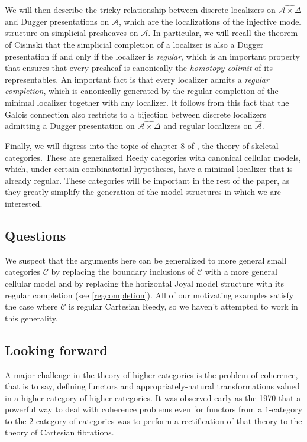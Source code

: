 \documentclass[a4paper]{article}
\numberwithin{equation}{subsection}
\theoremstyle{plain}   %
\theoremstyle{definition}
\theoremstyle{remark}
\theoremstyle{plain}
\newcommand{\psh}[1]{\ensuremath{\widehat{#1}}}
\providecommand{\C}{}
\renewcommand{\C}{\ensuremath{\mathcal{C}}}
\begin{document}
We will then describe the tricky relationship between discrete localizers on \(\psh{\mathcal{A}\times \Delta}\) and Dugger presentations on \(\mathcal{A}\), which are the localizations of the injective model structure on simplicial presheaves on \(\mathcal{A}\).  In particular, we will recall the theorem of Cisinski that the simplicial completion of a localizer is also a Dugger presentation if and only if the localizer is \emph{regular}, which is an important property that ensures that every presheaf is canonically the \emph{homotopy colimit} of its representables.  An important fact is that every localizer admits a \emph{regular completion}, which is canonically generated by the regular completion of the minimal localizer together with any localizer.  It follows from this fact that the Galois connection also restricts to a bijection between discrete localizers admitting a Dugger presentation on \(\psh{\mathcal{A}\times \Delta}\) and regular localizers on \(\psh{\mathcal{A}}\).  

Finally, we will digress into the topic of chapter 8 of \cite{cisinski-book}, the theory of skeletal categories.  These are generalized Reedy categories with canonical cellular models, which, under certain combinatorial hypotheses, have a minimal localizer that is already regular.  These categories will be important in the rest of the paper, as they greatly simplify the generation of the model structures in which we are interested.  

\subsection*{Questions}
We suspect that the arguments here can be generalized to more general small categories \(\C\) by replacing the boundary inclusions of \(\C\) with a more general cellular model and by replacing the horizontal Joyal model structure with its regular completion (see \ref{regcompletion}).  All of our motivating examples satisfy the case where \(\C\) is regular Cartesian Reedy, so we haven't attempted to work in this generality. 

\subsection*{Looking forward}
A major challenge in the theory of higher categories is the problem of coherence, that is to say, defining functors and appropriately-natural transformations valued in a higher category of higher categories. It was observed early as the 1970 that a powerful way to deal with coherence problems even for functors from a \(1\)-category to the \(2\)-category of categories was to perform a rectification of that theory to the theory of Cartesian fibrations.  
\end{document}
